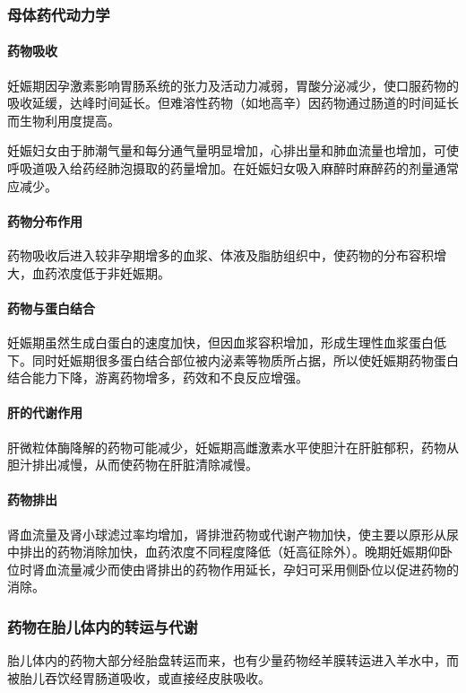 \subsubsection{母体药代动力学}
\paragraph{药物吸收}

妊娠期因孕激素影响胃肠系统的张力及活动力减弱，胃酸分泌减少，使口服药物的吸收延缓，达峰时间延长。但难溶性药物（如地高辛）因药物通过肠道的时间延长而生物利用度提高。

妊娠妇女由于肺潮气量和每分通气量明显增加，心排出量和肺血流量也增加，可使呼吸道吸入给药经肺泡摄取的药量增加。在妊娠妇女吸入麻醉时麻醉药的剂量通常应减少。
\paragraph{药物分布作用}

药物吸收后进入较非孕期增多的血浆、体液及脂肪组织中，使药物的分布容积增大，血药浓度低于非妊娠期。
\paragraph{药物与蛋白结合}

妊娠期虽然生成白蛋白的速度加快，但因血浆容积增加，形成生理性血浆蛋白低下。同时妊娠期很多蛋白结合部位被内泌素等物质所占据，所以使妊娠期药物蛋白结合能力下降，游离药物增多，药效和不良反应增强。
\paragraph{肝的代谢作用}

肝微粒体酶降解的药物可能减少，妊娠期高雌激素水平使胆汁在肝脏郁积，药物从胆汁排出减慢，从而使药物在肝脏清除减慢。
\paragraph{药物排出}

肾血流量及肾小球滤过率均增加，肾排泄药物或代谢产物加快，使主要以原形从尿中排出的药物消除加快，血药浓度不同程度降低（妊高征除外）。晚期妊娠期仰卧位时肾血流量减少而使由肾排出的药物作用延长，孕妇可采用侧卧位以促进药物的消除。

\subsubsection{药物在胎儿体内的转运与代谢}

胎儿体内的药物大部分经胎盘转运而来，也有少量药物经羊膜转运进入羊水中，而被胎儿吞饮经胃肠道吸收，或直接经皮肤吸收。
